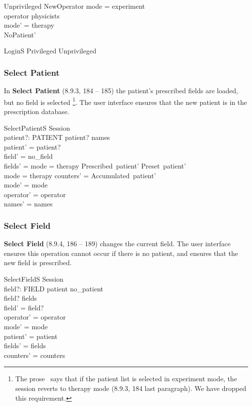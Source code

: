 \documentclass{article}
\begin{document}
\begin{schema}{Unprivileged}
	NewOperator
\where
        mode = experiment \\
        operator \notin physicists \\
	mode' = therapy \\
	NoPatient'
\end{schema}

\begin{zed}
LoginS  Privileged \lor Unprivileged
\end{zed}

\subsubsection{Select Patient}

In {\bf Select Patient} (8.9.3, 184 -- 185) the patient's
prescribed fields are loaded, but no field is selected
\footnote{The prose~\cite{jacky90d} says that if the patient list is
selected in experiment mode, the session reverts to therapy mode
(8.9.3, 184 last paragraph).  We have dropped this requirement.}.  The
user interface ensures that the new patient is in the prescription
database.

\begin{schema}{SelectPatientS}
	\Delta Session \\
	patient?: PATIENT
\where
	patient? \in names \\
	patient' = patient? \\
	field' = no\_field \\
	fields' = \IF mode = therapy \THEN Prescribed~patient' \ELSE Preset~patient' \\
	mode = therapy \implies counters' = Accumulated~patient' \\
\also
	mode' = mode  \\
	operator' = operator \\
	names' = names
\end{schema}

\subsubsection{Select Field}

{\bf Select Field} (8.9.4, 186 -- 189) changes the current field.
The user interface ensures this operation cannot occur if there is no
patient, and ensures that the new field is prescribed.

\begin{schema}{SelectFieldS}
	\Delta Session \\
	field?: FIELD
\where
	patient \neq no\_patient \\
	field? \in \dom fields \\
	field' = field? \\
\also
	operator' = operator \\
	mode' = mode \\
	patient' = patient \\
	fields' = fields \\
	counters' = counters
\end{schema}
\end{document}
